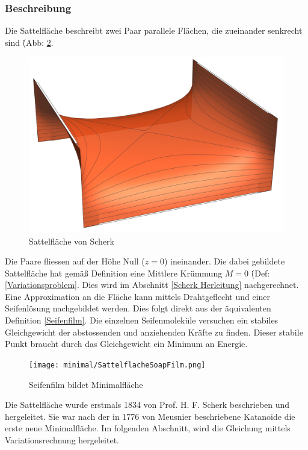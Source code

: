 \begin{refsection}
\subsubsection{Beschreibung}
Die Sattelfläche beschreibt zwei Paar parallele Flächen, die zueinander senkrecht sind \.(Abb: \ref{fig:SoapScherk}.
\begin{figure}
  \centering
  \includegraphics[scale=0.2]{minimal/HFSherk.png}
  \caption{Sattelfläche von Scherk} 
  \label{fig:Scherk}
\end{figure}
Die Paare fliessen auf der Höhe Null ($z=0$) ineinander. Die dabei gebildete Sattelfläche hat gemäß Definition eine Mittlere Krümmung $M=0$ \. (Def: \ref{Variationsproblem}. Dies wird im Abschnitt \ref{Scherk Herleitung}  nachgerechnet.\\ Eine Approximation an die Fläche kann mittels Drahtgeflecht und einer Seifenlösung nachgebildet werden. Dies folgt direkt aus der äquivalenten Definition \ref{Seifenfilm}. Die einzelnen Seifenmoleküle versuchen ein stabiles Gleichgewicht der abstossenden und anziehenden Kräfte zu finden. Dieser stabile Punkt braucht durch das Gleichgewicht ein Minimum an Energie.
\begin{figure}
  \centering
  \texttt{[image: minimal/SattelflacheSoapFilm.png]}
  \caption{Seifenfilm bildet Minimalfläche} 
  \label{fig:SoapScherk}
\end{figure}
Die Sattelfläche wurde erstmals 1834 von Prof. H. F. Scherk beschrieben und hergeleitet. Sie war nach der in 1776 von Meusnier beschriebene Katanoide die erste neue Minimalfläche. Im folgenden Abschnitt, wird die Gleichung mittels Variationsrechnung hergeleitet.

\end{refsection}
